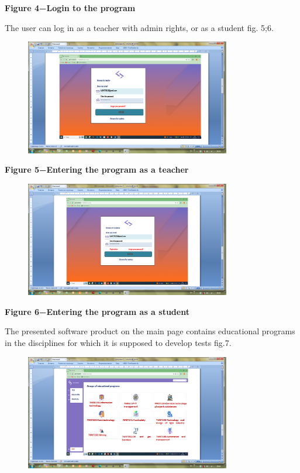 {\bfseries Figure 4−Login to the program}

The user can log in as a teacher with admin rights, or as a student fig.
5;6.

\begin{figure}[H]
	\centering
	\includegraphics[width=0.8\textwidth]{assets/49}
	\caption*{}
\end{figure}

{\bfseries Figure 5−Entering the program as a teacher}

\begin{figure}[H]
	\centering
	\includegraphics[width=0.8\textwidth]{assets/50}
	\caption*{}
\end{figure}

{\bfseries Figure 6−Entering the program as a student}

The presented software product on the main page contains educational
programs in the disciplines for which it is supposed to develop tests
fig.7.

\begin{figure}[H]
	\centering
	\includegraphics[width=0.8\textwidth]{assets/51}
	\caption*{}
\end{figure}

